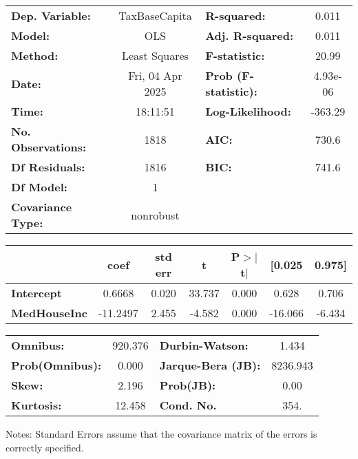 \begin{center}
\begin{tabular}{lclc}
\toprule
\textbf{Dep. Variable:}    &  TaxBaseCapita   & \textbf{  R-squared:         } &     0.011   \\
\textbf{Model:}            &       OLS        & \textbf{  Adj. R-squared:    } &     0.011   \\
\textbf{Method:}           &  Least Squares   & \textbf{  F-statistic:       } &     20.99   \\
\textbf{Date:}             & Fri, 04 Apr 2025 & \textbf{  Prob (F-statistic):} &  4.93e-06   \\
\textbf{Time:}             &     18:11:51     & \textbf{  Log-Likelihood:    } &   -363.29   \\
\textbf{No. Observations:} &        1818      & \textbf{  AIC:               } &     730.6   \\
\textbf{Df Residuals:}     &        1816      & \textbf{  BIC:               } &     741.6   \\
\textbf{Df Model:}         &           1      & \textbf{                     } &             \\
\textbf{Covariance Type:}  &    nonrobust     & \textbf{                     } &             \\
\bottomrule
\end{tabular}
\begin{tabular}{lcccccc}
                     & \textbf{coef} & \textbf{std err} & \textbf{t} & \textbf{P$> |$t$|$} & \textbf{[0.025} & \textbf{0.975]}  \\
\midrule
\textbf{Intercept}   &       0.6668  &        0.020     &    33.737  &         0.000        &        0.628    &        0.706     \\
\textbf{MedHouseInc} &     -11.2497  &        2.455     &    -4.582  &         0.000        &      -16.066    &       -6.434     \\
\bottomrule
\end{tabular}
\begin{tabular}{lclc}
\textbf{Omnibus:}       & 920.376 & \textbf{  Durbin-Watson:     } &    1.434  \\
\textbf{Prob(Omnibus):} &   0.000 & \textbf{  Jarque-Bera (JB):  } & 8236.943  \\
\textbf{Skew:}          &   2.196 & \textbf{  Prob(JB):          } &     0.00  \\
\textbf{Kurtosis:}      &  12.458 & \textbf{  Cond. No.          } &     354.  \\
\bottomrule
\end{tabular}
\end{center}

Notes: \newline
 [1] Standard Errors assume that the covariance matrix of the errors is correctly specified.